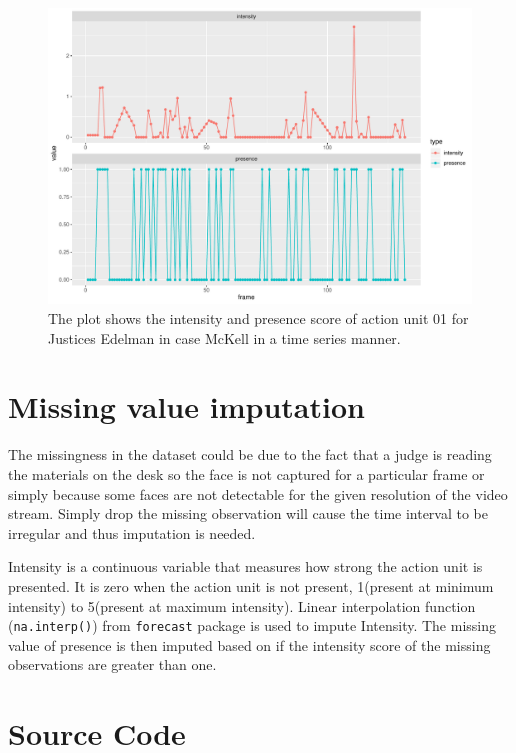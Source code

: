 \documentclass{monashthesis}
\begin{document}
\begin{figure}

{\centering \includegraphics[width=1\linewidth]{figures/ts-plot-1} 

}

\caption{The plot shows the intensity and presence score of action unit 01 for Justices Edelman in case McKell in a time series manner. }\label{fig:ts-plot}
\end{figure}

\hypertarget{missing-value-imputation}{%
\section{Missing value imputation}\label{missing-value-imputation}}

The missingness in the dataset could be due to the fact that a judge is reading the materials on the desk so the face is not captured for a particular frame or simply because some faces are not detectable for the given resolution of the video stream. Simply drop the missing observation will cause the time interval to be irregular and thus imputation is needed.

Intensity is a continuous variable that measures how strong the action unit is presented. It is zero when the action unit is not present, 1(present at minimum intensity) to 5(present at maximum intensity). Linear interpolation function (\texttt{na.interp()}) from \texttt{forecast} package is used to impute Intensity. The missing value of presence is then imputed based on if the intensity score of the missing observations are greater than one.

\hypertarget{source-code}{%
\section{Source Code}\label{source-code}}
\end{document}
